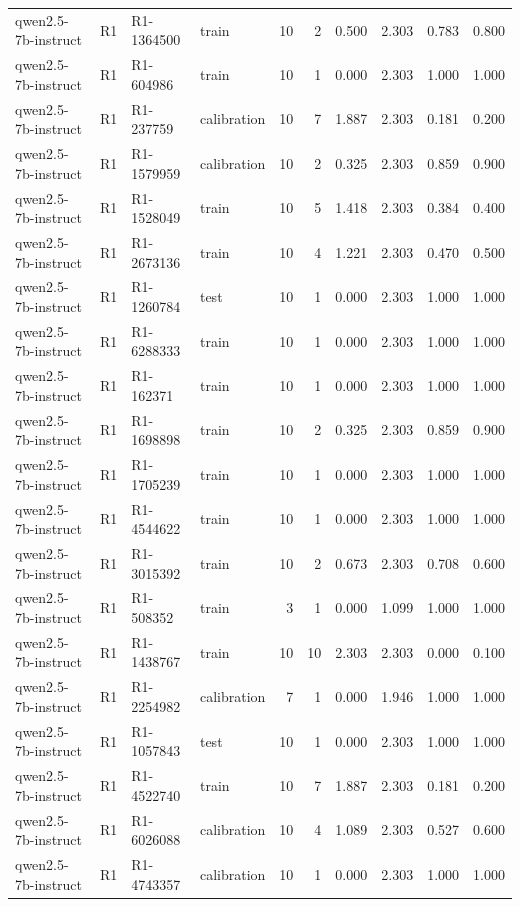 \begin{table}
\begin{tabular}{llllrrrrrr}
qwen2.5-7b-instruct & R1 & R1-1364500 & train & 10 & 2 & 0.500 & 2.303 & 0.783 & 0.800 \\
qwen2.5-7b-instruct & R1 & R1-604986 & train & 10 & 1 & 0.000 & 2.303 & 1.000 & 1.000 \\
qwen2.5-7b-instruct & R1 & R1-237759 & calibration & 10 & 7 & 1.887 & 2.303 & 0.181 & 0.200 \\
qwen2.5-7b-instruct & R1 & R1-1579959 & calibration & 10 & 2 & 0.325 & 2.303 & 0.859 & 0.900 \\
qwen2.5-7b-instruct & R1 & R1-1528049 & train & 10 & 5 & 1.418 & 2.303 & 0.384 & 0.400 \\
qwen2.5-7b-instruct & R1 & R1-2673136 & train & 10 & 4 & 1.221 & 2.303 & 0.470 & 0.500 \\
qwen2.5-7b-instruct & R1 & R1-1260784 & test & 10 & 1 & 0.000 & 2.303 & 1.000 & 1.000 \\
qwen2.5-7b-instruct & R1 & R1-6288333 & train & 10 & 1 & 0.000 & 2.303 & 1.000 & 1.000 \\
qwen2.5-7b-instruct & R1 & R1-162371 & train & 10 & 1 & 0.000 & 2.303 & 1.000 & 1.000 \\
qwen2.5-7b-instruct & R1 & R1-1698898 & train & 10 & 2 & 0.325 & 2.303 & 0.859 & 0.900 \\
qwen2.5-7b-instruct & R1 & R1-1705239 & train & 10 & 1 & 0.000 & 2.303 & 1.000 & 1.000 \\
qwen2.5-7b-instruct & R1 & R1-4544622 & train & 10 & 1 & 0.000 & 2.303 & 1.000 & 1.000 \\
qwen2.5-7b-instruct & R1 & R1-3015392 & train & 10 & 2 & 0.673 & 2.303 & 0.708 & 0.600 \\
qwen2.5-7b-instruct & R1 & R1-508352 & train & 3 & 1 & 0.000 & 1.099 & 1.000 & 1.000 \\
qwen2.5-7b-instruct & R1 & R1-1438767 & train & 10 & 10 & 2.303 & 2.303 & 0.000 & 0.100 \\
qwen2.5-7b-instruct & R1 & R1-2254982 & calibration & 7 & 1 & 0.000 & 1.946 & 1.000 & 1.000 \\
qwen2.5-7b-instruct & R1 & R1-1057843 & test & 10 & 1 & 0.000 & 2.303 & 1.000 & 1.000 \\
qwen2.5-7b-instruct & R1 & R1-4522740 & train & 10 & 7 & 1.887 & 2.303 & 0.181 & 0.200 \\
qwen2.5-7b-instruct & R1 & R1-6026088 & calibration & 10 & 4 & 1.089 & 2.303 & 0.527 & 0.600 \\
qwen2.5-7b-instruct & R1 & R1-4743357 & calibration & 10 & 1 & 0.000 & 2.303 & 1.000 & 1.000 \\

\end{tabular}
\end{table}
